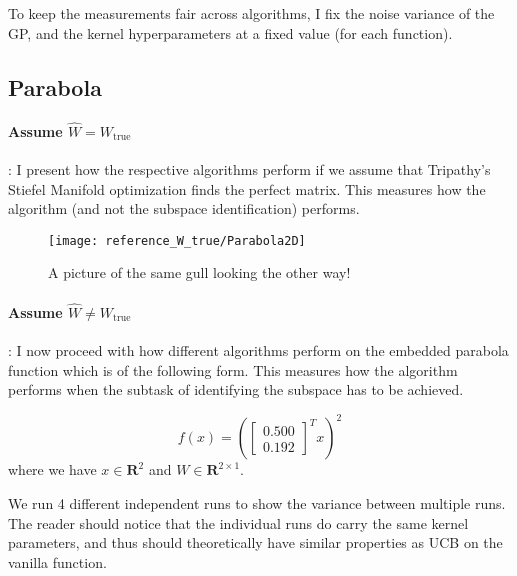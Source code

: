 To keep the measurements fair across algorithms, I fix the noise variance of the GP, and the kernel hyperparameters at a fixed value (for each function).

\subsection{Parabola}

\paragraph{Assume $\hat{W} = W_{\text{true}}$}: I present how the respective algorithms perform if we assume that Tripathy's Stiefel Manifold optimization finds the perfect matrix.
This measures how the algorithm (and not the subspace identification) performs.

\begin{figure}[H]
  \centering
      \texttt{[image: reference\_W\_true/Parabola2D]}
  \caption{A picture of the same gull looking the other way!}
\end{figure}

\paragraph{Assume $\hat{W} \neq W_{\text{true}}$}: I now proceed with how different algorithms perform on the embedded parabola function which is of the following form.
This measures how the algorithm performs when the subtask of identifying the subspace has to be achieved.

\def\WParaboa2D{
\begin{bmatrix}
    0.500\\
    0.192
\end{bmatrix}}


\begin{equation}
f(x) = \left( \WParaboa2D^T x \right)^2
\end{equation}
where we have $x \in \mathbf{R}^2$ and $W \in \mathbf{R}^{2 \times 1}$.

We run 4 different independent runs to show the variance between multiple runs.
The reader should notice that the individual runs do carry the same kernel parameters, and thus should theoretically have similar properties as UCB on the vanilla function.

